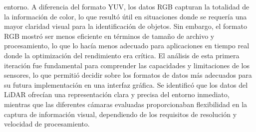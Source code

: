        entorno. A diferencia del formato YUV, los datos RGB capturan la totalidad de la informaci\'on de color, 
        lo que result\'o \'util en situaciones donde se requer\'ia una mayor claridad visual para la identificaci\'on 
        de objetos. Sin embargo, el formato RGB mostr\'o ser menos eficiente en t\'erminos de tama\~no de archivo y 
        procesamiento, lo que lo hac\'ia menos adecuado para aplicaciones en tiempo real donde la optimizaci\'on 
        del rendimiento era cr\'itica.
    \vskip 0.5cm
    El an\'alisis de esta primera iteraci\'on fue fundamental para comprender las capacidades y limitaciones de los 
        sensores, lo que permiti\'o decidir sobre los formatos de datos m\'as adecuados para su futura implementaci\'on 
        en una interfaz gr\'afica. Se identific\'o que los datos del LiDAR ofrec\'ian una representaci\'on clara y precisa 
        del entorno inmediato, mientras que las diferentes c\'amaras evaluadas proporcionaban flexibilidad en la 
        captura de informaci\'on visual, dependiendo de los requisitos de resoluci\'on y velocidad de procesamiento.
